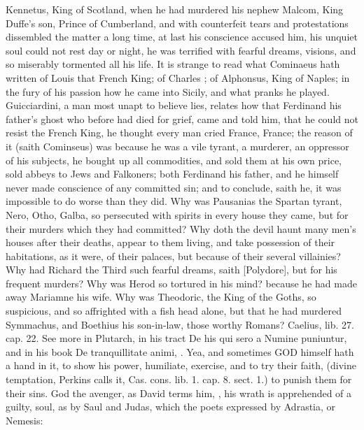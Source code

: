 {Kennetus, King of Scotland, when he had murdered his nephew
Malcom, King Duffe's son, Prince of Cumberland, and with counterfeit
tears and protestations dissembled the matter a long time, at
last his conscience accused him, his unquiet soul could not rest day or
night, he was terrified with fearful dreams, visions, and so miserably
tormented all his life. It is strange to read what Cominaeus hath
written of Louis  that French King; of Charles ; of Alphonsus,
King of Naples; in the fury of his passion how he came into Sicily, and
what pranks he played. Guicciardini, a man most unapt to believe lies,
relates how that Ferdinand his father's ghost who before had died for
grief, came and told him, that he could not resist the French King, he
thought every man cried France, France; the reason of it (saith
Cominseus) was because he was a vile tyrant, a murderer, an oppressor
of his subjects, he bought up all commodities, and sold them at his own
price, sold abbeys to Jews and Falkoners; both Ferdinand his father,
and he himself never made conscience of any committed sin; and to
conclude, saith he, it was impossible to do worse than they did. Why
was Pausanias the Spartan tyrant, Nero, Otho, Galba, so persecuted with
spirits in every house they came, but for their murders which they had
committed? Why doth the devil haunt many men's houses after their
deaths, appear to them living, and take possession of their
habitations, as it were, of their palaces, but because of their several
villainies? Why had Richard the Third such fearful dreams, saith
[Polydore], but for his frequent murders? Why was Herod so tortured in
his mind? because he had made away Mariamne his wife. Why was
Theodoric, the King of the Goths, so suspicious, and so affrighted with
a fish head alone, but that he had murdered Symmachus, and Boethius his
son-in-law, those worthy Romans? Caelius, lib. 27. cap. 22. See more in
Plutarch, in his tract De his qui sero a Numine puniuntur, and in his
book De tranquillitate animi, \etc{}. Yea, and sometimes \textsc{GOD} himself hath a
hand in it, to show his power, humiliate, exercise, and to try their
faith, (divine temptation, Perkins calls it, Cas. cons. lib. 1. cap. 8.
sect. 1.) to punish them for their sins. God the avenger, as
David terms him, , his wrath is apprehended of
a guilty, soul, as by Saul and Judas, which the poets expressed by
Adrastia, or Nemesis:

}
